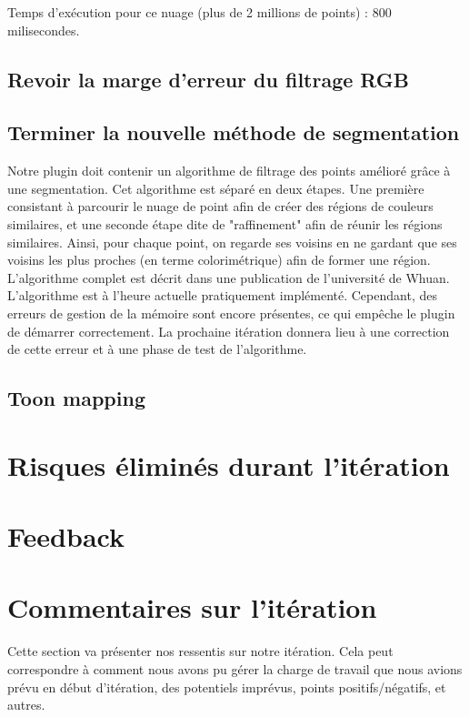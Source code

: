 \documentclass[12pt,titlepage,french]{article}
\begin{document}
Temps d'exécution pour ce nuage (plus de 2 millions de points) : 800 milisecondes.

\subsection{Revoir la marge d'erreur du filtrage RGB}

\subsection{Terminer la nouvelle méthode de segmentation}

Notre plugin doit contenir un algorithme de filtrage des points amélioré grâce à une segmentation. Cet algorithme est séparé en deux étapes. Une première consistant à parcourir le nuage de point afin de créer des régions de couleurs similaires, et une seconde étape dite de "raffinement" afin de réunir les régions similaires. \newline
Ainsi, pour chaque point, on regarde ses voisins en ne gardant que ses voisins les plus proches (en terme colorimétrique) afin de former une région. L'algorithme complet est décrit dans une publication de l'université de \cite{B03} Whuan. 
L'algorithme est à l'heure actuelle pratiquement implémenté. Cependant, des erreurs de gestion de la mémoire sont encore présentes, ce qui empêche le plugin de démarrer correctement. La prochaine itération donnera lieu à une correction de cette erreur et à une phase de test de l'algorithme.
\subsection{Toon mapping}

\section{Risques éliminés durant l'itération}


\section{Feedback}



\section{Commentaires sur l'itération}

Cette section va présenter nos ressentis sur notre itération. Cela peut correspondre à comment nous avons pu gérer la charge de travail que nous avions prévu en début d'itération, des potentiels imprévus, points positifs/négatifs, et autres.
\end{document}
